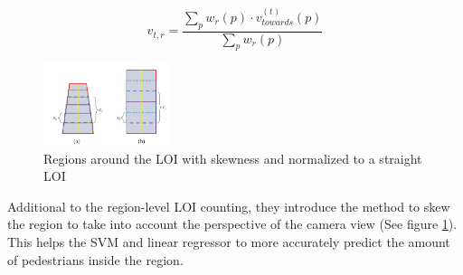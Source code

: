 \begin{equation}
	v_{t,r} = \frac{\sum_p w_r(p) \cdot v^{(t)}_{towards}(p)}{\sum_p w_r(p)}
	\label{eq:zheng_region_vel}
\end{equation}

\begin{figure}[h]
\centering
\includegraphics[width=0.33\textwidth]{images/zheng19_regions}
\caption{Regions around the LOI with skewness and normalized to a straight LOI}
\label{fig:zheng_skew}
\end{figure}

Additional to the region-level LOI counting, they introduce the method to skew the region to take into account the perspective of the camera view (See figure \ref{fig:zheng_skew}). This helps the SVM and linear regressor to more accurately predict the amount of pedestrians inside the region.
